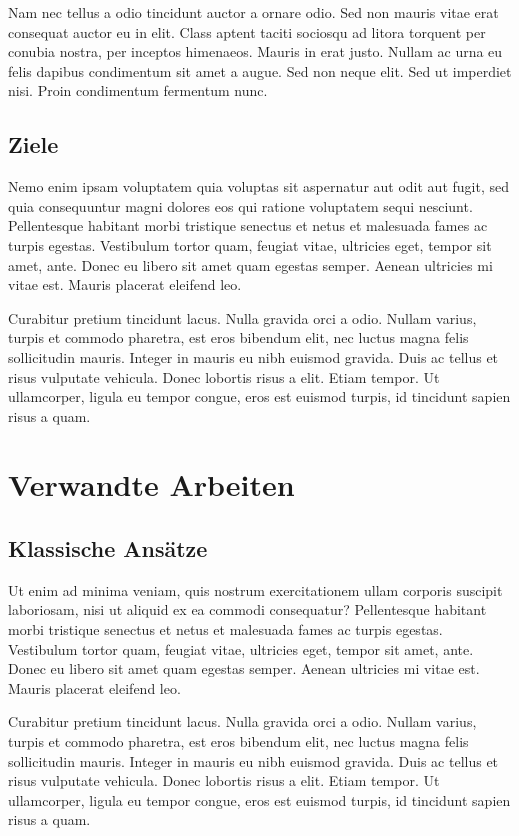 \documentclass[twocolumn]{article}
\begin{document}
Nam nec tellus a odio tincidunt auctor a ornare odio. Sed non mauris vitae erat consequat auctor eu in elit. Class aptent taciti sociosqu ad litora torquent per conubia nostra, per inceptos himenaeos. Mauris in erat justo. Nullam ac urna eu felis dapibus condimentum sit amet a augue. Sed non neque elit. Sed ut imperdiet nisi. Proin condimentum fermentum nunc.


\subsection{Ziele}
Nemo enim ipsam voluptatem quia voluptas sit aspernatur aut odit aut fugit, sed quia consequuntur magni dolores eos qui ratione voluptatem sequi nesciunt. Pellentesque habitant morbi tristique senectus et netus et malesuada fames ac turpis egestas. Vestibulum tortor quam, feugiat vitae, ultricies eget, tempor sit amet, ante. Donec eu libero sit amet quam egestas semper. Aenean ultricies mi vitae est. Mauris placerat eleifend leo.

Curabitur pretium tincidunt lacus. Nulla gravida orci a odio. Nullam varius, turpis et commodo pharetra, est eros bibendum elit, nec luctus magna felis sollicitudin mauris. Integer in mauris eu nibh euismod gravida. Duis ac tellus et risus vulputate vehicula. Donec lobortis risus a elit. Etiam tempor. Ut ullamcorper, ligula eu tempor congue, eros est euismod turpis, id tincidunt sapien risus a quam.


\section{Verwandte Arbeiten}
\subsection{Klassische Ansätze}
Ut enim ad minima veniam, quis nostrum exercitationem ullam corporis suscipit laboriosam, nisi ut aliquid ex ea commodi consequatur? Pellentesque habitant morbi tristique senectus et netus et malesuada fames ac turpis egestas. Vestibulum tortor quam, feugiat vitae, ultricies eget, tempor sit amet, ante. Donec eu libero sit amet quam egestas semper. Aenean ultricies mi vitae est. Mauris placerat eleifend leo.

Curabitur pretium tincidunt lacus. Nulla gravida orci a odio. Nullam varius, turpis et commodo pharetra, est eros bibendum elit, nec luctus magna felis sollicitudin mauris. Integer in mauris eu nibh euismod gravida. Duis ac tellus et risus vulputate vehicula. Donec lobortis risus a elit. Etiam tempor. Ut ullamcorper, ligula eu tempor congue, eros est euismod turpis, id tincidunt sapien risus a quam.
\end{document}
